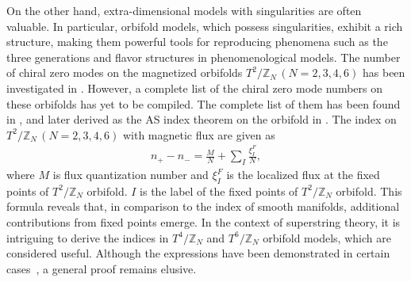 \documentclass[11pt]{article}
\begin{document}
On the other hand, extra-dimensional models with singularities are often valuable. In particular, orbifold models, which possess singularities, exhibit a rich structure, making them powerful tools for reproducing phenomena such as the three generations \cite{Sakamoto:2020pev,Abe:2008sx,Abe:2015yva,Abe:2013bca,Abe:2014noa,Kobayashi:2017dyu,Kobayashi:2022tti,Imai:2022bke,Kikuchi:2022lfv,Kikuchi:2022psj,Kikuchi:2023awm} and flavor structures \cite{PhysRevD.88.115007,Fujimoto:2016zjs,Kobayashi:2016qag,Buchmuller:2017vho,PhysRevD.97.075019,Kikuchi:2021yog,Hoshiya:2022qvr} in phenomenological models.
The number of chiral zero modes on the magnetized orbifolds $T^2/{\mathbb{Z}}_N\,(N=2,3,4,6)$ has been investigated in \cite{Abe:2013bca,Abe:2014noa,Kobayashi:2017dyu}. However, a complete list of the chiral zero mode numbers on these orbifolds has yet to be compiled.
The complete list of them %
has been found in \cite{Sakamoto:2020pev}, and later derived as the AS index theorem on the orbifold in \cite{Sakamoto:2020vdy,Kobayashi:2022tti,Imai:2022bke}.
The index on $T^2/{\mathbb{Z}}_N\,(N=2,3,4,6)$ with magnetic flux  are given as \cite{Kobayashi:2022tti}
\begin{align}
 n_{+}-n_{-}=\frac{M}{N}+\sum_{I}\frac{\xi_{I}^{F}}{N},
 \label{indT2ZN}
\end{align}
where $M$ is flux quantization number and $\xi_{I}^{F}$ is the localized flux at the fixed points of $T^2/{\mathbb{Z}}_N$ orbifold. $I$ is the label of the fixed points of $T^2/{\mathbb{Z}}_N$ orbifold.
This formula reveals that, in comparison to the index of smooth manifolds, additional contributions from fixed points emerge.
In the context of superstring theory, it is intriguing to derive the indices in $T^4/{\mathbb{Z}}_N$ and $T^6/{\mathbb{Z}}_N$ orbifold models, which are considered useful. Although the expressions have been demonstrated in certain cases~\cite{Kikuchi:2022lfv,Kikuchi:2022psj,Kikuchi:2023awm}, a general proof remains elusive. %
\end{document}
